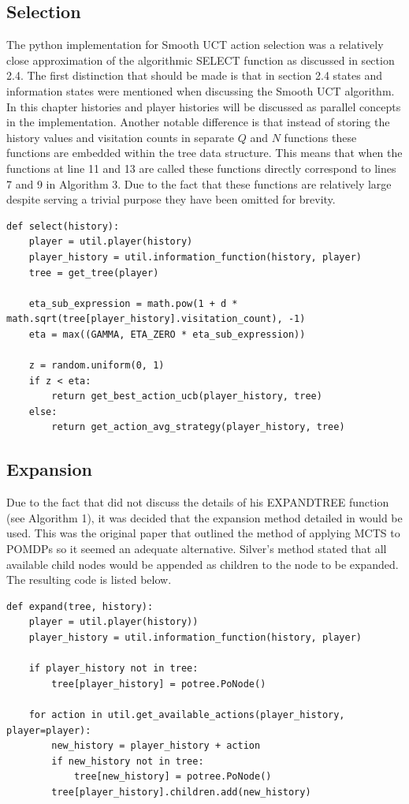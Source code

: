 \subsection{Selection}\label{subsec:selection}
The python implementation for Smooth UCT action selection was a relatively close approximation of the
algorithmic SELECT function as discussed in section 2.4.
The first distinction that should be made is that in section 2.4 states and information
states were mentioned when discussing the Smooth UCT algorithm.
In this chapter histories and player histories will be discussed as parallel concepts in the implementation.
Another notable difference is that instead of storing the history values and visitation
counts in separate $Q$ and $N$ functions these functions are embedded within the tree data
structure.
This means that when the functions at line 11 and 13 are called these
functions directly correspond to lines 7 and 9 in Algorithm 3.
Due to the fact that these functions are relatively large despite serving a trivial
purpose they have been omitted for brevity.

\begin{lstlisting}[style=Python]
def select(history):
    player = util.player(history)
    player_history = util.information_function(history, player)
    tree = get_tree(player)

    eta_sub_expression = math.pow(1 + d * math.sqrt(tree[player_history].visitation_count), -1)
    eta = max((GAMMA, ETA_ZERO * eta_sub_expression))

    z = random.uniform(0, 1)
    if z < eta:
        return get_best_action_ucb(player_history, tree)
    else:
        return get_action_avg_strategy(player_history, tree)
\end{lstlisting}


\subsection{Expansion}\label{subsec:expansion}
Due to the fact that\citep{heinrich2017reinforcement} did not discuss the details of his EXPANDTREE
function (see Algorithm 1), it was decided that the expansion method detailed
in\citep{silver2010monte} would be used.
This was the original paper that outlined the method of applying MCTS to POMDPs so it seemed
an adequate alternative.
Silver's method stated that all available child nodes would be appended as children to the node to be expanded.
The resulting code is listed below.

\begin{lstlisting}[style=Python]
def expand(tree, history):
    player = util.player(history))
    player_history = util.information_function(history, player)

    if player_history not in tree:
        tree[player_history] = potree.PoNode()

    for action in util.get_available_actions(player_history, player=player):
        new_history = player_history + action
        if new_history not in tree:
            tree[new_history] = potree.PoNode()
        tree[player_history].children.add(new_history)
\end{lstlisting}


